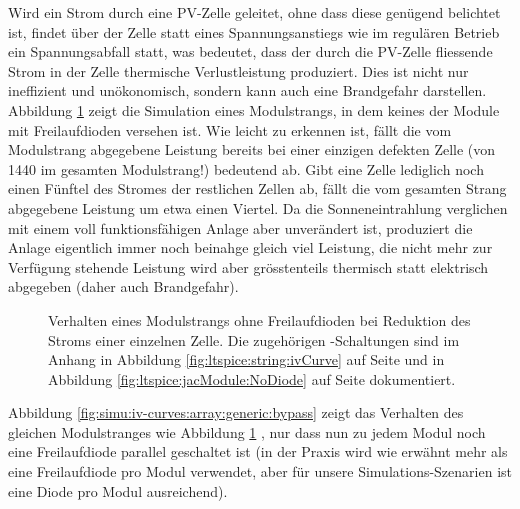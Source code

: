 \clearpage
Wird   ein   Strom   durch   eine   PV-Zelle   geleitet,   ohne   dass   diese
gen\"ugend   belichtet   ist,   findet    \"uber   der   Zelle   statt   eines
Spannungsanstiegs  wie  im  regul\"aren  Betrieb  ein  Spannungsabfall  statt,
was   bedeutet,   dass   der   durch  die   PV-Zelle   fliessende   Strom   in
der   Zelle  thermische   Verlustleistung  produziert. Dies   ist  nicht   nur
ineffizient   und  un\"okonomisch,   sondern   kann   auch  eine   Brandgefahr
darstellen. Abbildung    \ref{fig:simu:iv-curves:array:generic}   zeigt    die
Simulation eines  Modulstrangs, in  dem keines  der Module  mit Freilaufdioden
versehen  ist. Wie  leicht  zu  erkennen  ist,  f\"allt  die  vom  Modulstrang
abgegebene Leistung  bereits bei  einer einzigen defekten  Zelle (von  1440 im
gesamten  Modulstrang!) bedeutend  ab. Gibt  eine Zelle  lediglich noch  einen
F\"unftel  des Stromes  der restlichen  Zellen  ab, f\"allt  die vom  gesamten
Strang  abgegebene Leistung  um etwa  einen Viertel. Da  die Sonneneintrahlung
verglichen mit  einem voll  funktionsf\"ahigen Anlage aber  unver\"andert ist,
produziert die Anlage eigentlich immer noch beinahge gleich viel Leistung, die
nicht  mehr  zur  Verf\"ugung  stehende  Leistung  wird  aber  gr\"osstenteils
thermisch statt elektrisch abgegeben (daher auch Brandgefahr).


\begin{figure}[h!tb]
    \centering
    
    \caption[%
        IV- und PV-Kurven eines Modulsstrangs bei Leistungseinbruch,
        keine Freilaufdioden%
    ]
    {%
        Verhalten       eines      Modulstrangs       ohne      Freilaufdioden
        bei     Reduktion     des     Stroms    einer     einzelnen     Zelle.
        Die      zugeh\"origen     -Schaltungen      sind     im
        Anhang       in       Abbildung       \ref{fig:ltspice:string:ivCurve}
        auf     Seite      \pageref{fig:ltspice:string:ivCurve}     und     in
        Abbildung      \ref{fig:ltspice:jacModule:NoDiode}      auf      Seite
        \pageref{fig:ltspice:jacModule:NoDiode} dokumentiert.%
    }
    \label{fig:simu:iv-curves:array:generic}
\end{figure}

\clearpage
Abbildung     \ref{fig:simu:iv-curves:array:generic:bypass}      zeigt     das
Verhalten       des      gleichen       Modulstranges      wie       Abbildung
\ref{fig:simu:iv-curves:array:generic} , nur dass nun zu jedem Modul noch eine
Freilaufdiode  parallel  geschaltet ist  (in  der  Praxis wird  wie  erw\"ahnt
mehr  als   eine  Freilaufdiode  pro   Modul  verwendet,  aber   f\"ur  unsere
Simulations-Szenarien ist eine Diode pro Modul ausreichend).

